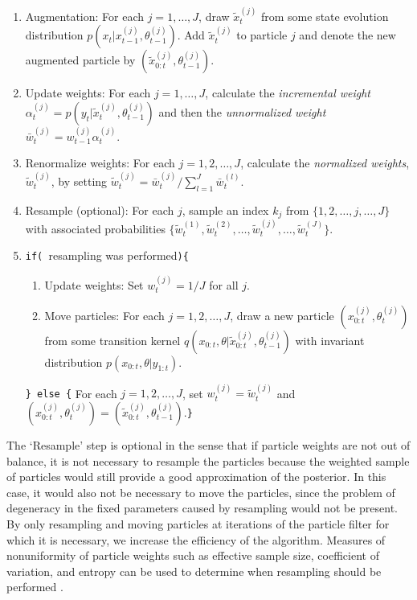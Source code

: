 \documentclass{article}
\begin{document}
\begin{enumerate}
\item Augmentation: For each $j = 1,\ldots,J$, draw $\tilde{x}^{(j)}_t$ from some state evolution distribution $p\left(x_t|x^{(j)}_{t-1},\theta^{(j)}_{t-1}\right)$. Add $\tilde{x}^{(j)}_t$ to particle $j$ and denote the new augmented particle by $\left(\tilde{x}^{(j)}_{0:t},\theta^{(j)}_{t-1}\right)$.
\item Update weights: For each $j = 1,\ldots,J$, calculate the \emph{incremental weight} $\alpha^{(j)}_t = p\left(y_t|\tilde{x}^{(j)}_t,\theta^{(j)}_{t-1}\right)$ and then the \emph{unnormalized weight} $\bar{w}^{(j)}_t = w^{(j)}_{t-1}\alpha^{(j)}_t$.
\item Renormalize weights: For each $j = 1,2,\ldots,J$, calculate the \emph{normalized weights}, $\tilde{w}^{(j)}_t$, by setting $\tilde{w}^{(j)}_t = \bar{w}^{(j)}_t / \sum_{l=1}^J \bar{w}^{(l)}_t$.
\item Resample (optional): For each $j$, sample an index $k_j$ from $\{1,2,\ldots,j,\ldots,J\}$ with associated probabilities $\{\tilde{w}^{(1)}_t,\tilde{w}^{(2)}_t,\ldots,\tilde{w}^{(j)}_t,\ldots,\tilde{w}^{(J)}_t\}$.
\item {\tt if( }resampling was performed{\tt )\{} \\
\begin{enumerate}[label=\alph*.]
\item Update weights: Set $w^{(j)}_t = 1 / J$ for all $j$.
\item Move particles: For each $j = 1,2,\ldots,J$, draw a new particle $\left(x^{(j)}_{0:t},\theta^{(j)}_t\right)$ from some transition kernel $q\left(x_{0:t},\theta|\tilde{x}^{(j)}_{0:t},\theta^{(j)}_{t-1}\right)$ with invariant distribution $p(x_{0:t},\theta|y_{1:t})$.
\end{enumerate}
{\tt \} else \{} For each $j = 1,2,\ldots,J$, set $w^{(j)}_t = \tilde{w}^{(j)}_t$ and $\left(x^{(j)}_{0:t},\theta^{(j)}_t\right) = \left(\tilde{x}^{(j)}_{0:t},\theta^{(j)}_{t-1}\right)$.{\tt\}}
\end{enumerate}

The `Resample' step is optional in the sense that if particle weights are not out of balance, it is not necessary to resample the particles because the weighted sample of particles would still provide a good approximation of the posterior. In this case, it would also not be necessary to move the particles, since the problem of degeneracy in the fixed parameters caused by resampling would not be present. By only resampling and moving particles at iterations of the particle filter for which it is necessary, we increase the efficiency of the algorithm. Measures of nonuniformity of particle weights such as effective sample size, coefficient of variation, and entropy can be used to determine when resampling should be performed \citep{Liu:Chen:Wong:reje:1998}. %
\end{document}
